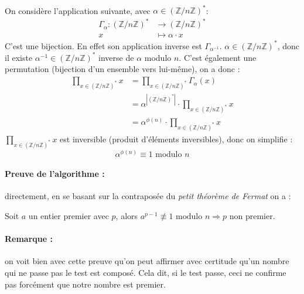 		\paragraph{}On considère l'application suivante, avec $\alpha \in (\mathbb{Z}/n\mathbb{Z})^*$:
			\begin{align*}
				\Gamma_{\alpha} \colon (\mathbb{Z}/n\mathbb{Z})^* &\to (\mathbb{Z}/n\mathbb{Z})^*\\
				x &\mapsto \alpha \cdot x
			\end{align*}
			C'est une bijection. En effet son application inverse est $\Gamma_{\alpha^{-1}}$. $\alpha \in (\mathbb{Z}/n\mathbb{Z})^*$, donc il existe $\alpha^{-1} \in (\mathbb{Z}/n\mathbb{Z})^*$ inverse de $\alpha$ modulo $n$. C'est également une permutation (bijection d'un ensemble vers lui-même), on a donc :
			\begin{align*}
				\prod_{x \in (\mathbb{Z}/n\mathbb{Z})^*} x &= \prod_{x \in (\mathbb{Z}/n\mathbb{Z})^*} \Gamma_{\alpha}(x)\\
				&= \alpha^{|(\mathbb{Z}/n\mathbb{Z})^* |} \cdot \prod_{x \in (\mathbb{Z}/n\mathbb{Z})^*} x\\
				&= \alpha^{\phi(n)} \cdot \prod_{x \in (\mathbb{Z}/n\mathbb{Z})^*} x
			\end{align*}
			$\prod_{x \in (\mathbb{Z}/n\mathbb{Z})^*} x$ est inversible (produit d'éléments inversibles), donc on simplifie :
			\[\alpha^{\phi(n)} \equiv 1 \text{ modulo } n \]
		
		\paragraph{Preuve de l'algorithme :} directement, en se basant sur la contraposée du \textit{petit théorème de Fermat} on a :
			\begin{center}
			Soit $a$ un entier premier avec $p$, alors $a^{p-1} \not\equiv 1 \text{ modulo } n \Rightarrow p$ non premier.
			\end{center}
		
		\paragraph{Remarque :} on voit bien avec cette preuve qu'on peut affirmer avec certitude qu'un nombre qui ne passe pas le test est composé. Cela dit, si le test passe, ceci ne confirme pas forcément que notre nombre est premier.
		
